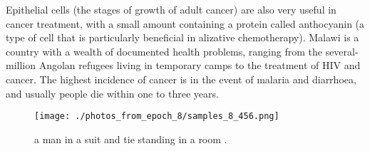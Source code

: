 \documentclass{article}%
\begin{document}
Epithelial cells (the stages of growth of adult cancer) are also very useful in cancer treatment, with a small amount containing a protein called anthocyanin (a type of cell that is particularly beneficial in alizative chemotherapy).\newline%
Malawi is a country with a wealth of documented health problems, ranging from the several{-}million Angolan refugees living in temporary camps to the treatment of HIV and cancer.\newline%
The highest incidence of cancer is in the event of malaria and diarrhoea, and usually people die within one to three years.\newline%

%


\begin{figure}[h!]%
\centering%
\texttt{[image: ./photos\_from\_epoch\_8/samples\_8\_456.png]}%
\caption{a man in a suit and tie standing in a room .}%
\end{figure}

%
\end{document}
